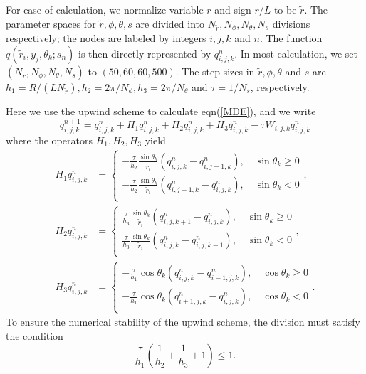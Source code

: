 \documentclass[prl,twocolumn,preprintnumbers,reprint]{revtex4}
\begin{document}
For ease of calculation, we normalize variable $r$ and sign $r/L$ to be $\tilde{r}$. The parameter spaces for $\tilde{r}, \phi, \theta, s$ are divided into $N_{\tilde{r}}, N_\phi, N_\theta, N_s$ divisions respectively; the nodes are labeled by integers $i,j,k$ and $n$. The function $q(\tilde{r}_i,y_j,\theta_k;s_n)$ is then directly represented by $q^n_{i,j,k}$. In most calculation, we set $(N_{\tilde{r}},N_\phi,N_\theta,N_s)$ to $(50,60,60,500)$. The step sizes in $\tilde{r},\phi,\theta$ and $s$ are $h_1=R/(LN_{\tilde{r}}),h_2=2\pi/N_\phi,h_3=2\pi/N_\theta$ and $\tau=1/N_s$, respectively.

Here we use the upwind scheme to calculate eqn(\ref{MDE}), and we write
\begin{equation}
q_{i,j,k}^{n+1}=q_{i,j,k}^n+H_1q_{i,j,k}^n+H_2q_{i,j,k}^n+H_3q_{i,j,k}^n-\tau W_{i,j,k}q_{i,j,k}^n
\end{equation}
where the operators $H_1,H_2,H_3$ yield
\begin{align}
H_1q_{i,j,k}^{n}&=
\begin{cases}
-\frac{\tau}{h_2}\frac{\sin\theta_k}{\tilde{r}_i}\left(q_{i,j,k}^{n}-q_{i,j-1,k}^{n}\right),\quad \sin\theta_k\geq0\\[1mm]
-\frac{\tau}{h_2}\frac{\sin\theta_k}{\tilde{r}_i}\left(q_{i,j+1,k}^{n}-q_{i,j,k}^{n}\right),\quad \sin\theta_k<0\\
\end{cases},\\
H_2q_{i,j,k}^{n}&=
\begin{cases}
\frac{\tau}{h_3}\frac{\sin\theta_k}{\tilde{r}_i}\left(q_{i,j,k+1}^{n}-q_{i,j,k}^{n}\right),\quad \sin\theta_k\geq0\\[1mm]
\frac{\tau}{h_3}\frac{\sin\theta_k}{\tilde{r}_i}\left(q_{i,j,k}^{n}-q_{i,j,k-1}^{n}\right),\quad \sin\theta_k<0\\
\end{cases},\\
H_3q_{i,j,k}^{n}&=
\begin{cases}
-\frac{\tau}{h_1}\cos\theta_k\left(q_{i,j,k}^{n}-q_{i-1,j,k}^{n}\right),\quad \cos\theta_k\geq0\\[1mm]
-\frac{\tau}{h_1}\cos\theta_k\left(q_{i+1,j,k}^{n}-q_{i,j,k}^{n}\right),\quad \cos\theta_k<0\\
\end{cases}.
\end{align}
To ensure the numerical stability of the upwind scheme, the division must satisfy the condition
\begin{equation}
\frac{\tau}{h_1}\left(\frac{1}{h_2}+\frac{1}{h_3}+1\right)\leq1.
\end{equation}
\end{document}
